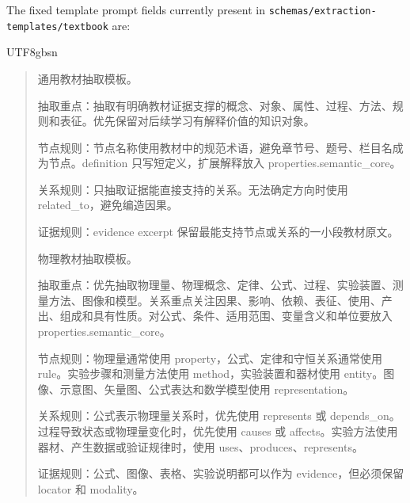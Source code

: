 \documentclass[11pt,letterpaper]{article}
\newcommand{\code}[1]{\nolinkurl{#1}}
\newenvironment{prompttranscript}{%
\begin{CJK}{UTF8}{gbsn}%
\begin{quote}%
\small%
\sloppy%
\setlength{\parskip}{0.35em}%
\setlength{\parindent}{0pt}%
}{%
\end{quote}%
\end{CJK}%
}
\newenvironment{prompttranscript}{%
\begin{quote}%
\small%
\sloppy%
\setlength{\parskip}{0.35em}%
\setlength{\parindent}{0pt}%
}{%
\end{quote}%
}
\begin{document}
The fixed template prompt fields currently present in \code{schemas/extraction-templates/textbook} are:

\begin{prompttranscript}
通用教材抽取模板。\par
抽取重点：抽取有明确教材证据支撑的概念、对象、属性、过程、方法、规则和表征。优先保留对后续学习有解释价值的知识对象。\par
节点规则：节点名称使用教材中的规范术语，避免章节号、题号、栏目名成为节点。definition 只写短定义，扩展解释放入 properties.semantic\_core。\par
关系规则：只抽取证据能直接支持的关系。无法确定方向时使用 related\_to，避免编造因果。\par
证据规则：evidence excerpt 保留最能支持节点或关系的一小段教材原文。\par

物理教材抽取模板。\par
抽取重点：优先抽取物理量、物理概念、定律、公式、过程、实验装置、测量方法、图像和模型。关系重点关注因果、影响、依赖、表征、使用、产出、组成和具有性质。对公式、条件、适用范围、变量含义和单位要放入 properties.semantic\_core。\par
节点规则：物理量通常使用 property，公式、定律和守恒关系通常使用 rule。实验步骤和测量方法使用 method，实验装置和器材使用 entity。图像、示意图、矢量图、公式表达和数学模型使用 representation。\par
关系规则：公式表示物理量关系时，优先使用 represents 或 depends\_on。过程导致状态或物理量变化时，优先使用 causes 或 affects。实验方法使用器材、产生数据或验证规律时，使用 uses、produces、represents。\par
证据规则：公式、图像、表格、实验说明都可以作为 evidence，但必须保留 locator 和 modality。\par


\end{prompttranscript}
\end{document}
